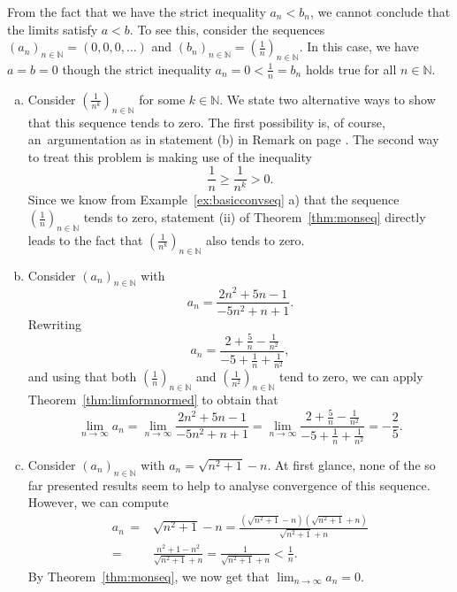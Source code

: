\begin{Attention}{}
  From the fact that we have the strict inequality $a_n<b_n$, we cannot conclude that the limits satisfy $a<b$. To see this, consider the sequences\linebreak $(a_n)_{n\in\mathbb{N}}=(0,0,0,\ldots)$ and
  $(b_n)_{n\in\mathbb{N}}=(\frac1n)_{n\in\mathbb{N}}$. In this case, we have $a=b=0$ though the strict inequality $a_n=0<\frac1n=b_n$ holds true for all $n\in\mathbb{N}$.
\end{Attention}

\begin{example}
\begin{enumerate}[a)]
  \item Consider $(\frac1{n^k})_{n\in\mathbb{N}}$ for some $k\in\mathbb{N}$. We state two alternative ways to show that this sequence tends to zero.
The first possibility is, of course, an~argumentation as in statement (b) in Remark on page \pageref{rem:seqpot}. The second way to treat this problem is making use of the inequality
\[\frac1n\geq\frac1{n^k}>0.\]
    Since we know from Example~\ref{ex:basicconvseq} a) that the sequence $(\frac1n)_{n\in\mathbb{N}}$ tends to zero, statement (ii) of Theorem~\ref{thm:monseq} directly leads to the fact that
    $(\frac1{n^k})_{n\in\mathbb{N}}$ also tends to zero.
  \item Consider $(a_n)_{n\in\mathbb{N}}$ with
\[a_n=\frac{2n^2+5n-1}{-5n^2+n+1}.\]
Rewriting
\[a_n=\frac{2+\frac5n-\frac1{n^2}}{-5+\frac1n+\frac1{n^2}},\]
    and using that both $(\frac1{n})_{n\in\mathbb{N}}$ and $(\frac1{n^2})_{n\in\mathbb{N}}$ tend to zero, we can apply Theorem~\ref{thm:limformnormed} to obtain that
\[\lim_{n\to\infty}a_n=\lim_{n\to\infty}\frac{2n^2+5n-1}{-5n^2+n+1}=\lim_{n\to\infty}\frac{2+\frac5n-\frac1{n^2}}{-5+\frac1n+\frac1{n^2}}=-\frac25.\]
\item Consider $(a_n)_{n\in\mathbb{N}}$ with $a_n=\sqrt{n^2+1}-n$. At first glance, none of the so far presented results seem to help to analyse convergence of this sequence. However, we can compute
\[
\begin{aligned}
a_n\,=&\sqrt{n^2+1}-n
=\frac{(\sqrt{n^2+1}-n)(\sqrt{n^2+1}+n)}{\sqrt{n^2+1}+n}\\
=&\frac{n^2+1-n^2}{\sqrt{n^2+1}+n}
=\frac{1}{\sqrt{n^2+1}+n}<\frac1n.
\end{aligned}
\]
By Theorem~\ref{thm:monseq}, we now get that $\lim_{n\to\infty}a_n=0$.
\end{enumerate}
\end{example}
